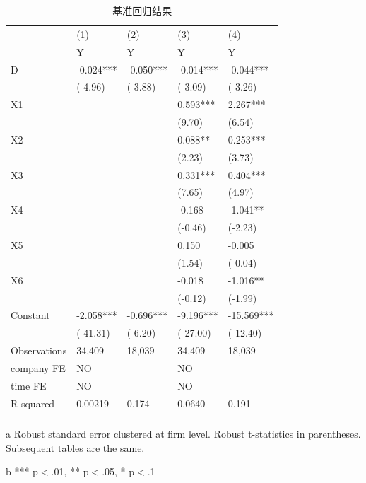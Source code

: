 \documentclass[]{WTUthesis}
\renewcommand{\toprule}{\noalign{\vskip2pt}\specialrule{1.5pt}{0pt}{0pt}\noalign{\vskip2pt}}
\renewcommand{\midrule}{\noalign{\vskip2pt}\specialrule{0.75pt}{0pt}{0pt}\noalign{\vskip2pt}}
\renewcommand{\bottomrule}{\noalign{\vskip2pt}\specialrule{1.5pt}{0pt}{0pt}\noalign{\vskip2pt}}
\begin{document}
	\begin{table}[htbp]
		\centering
		\caption{基准回归结果}
		\label{baseline}
		\begin{threeparttable}
			\begin{tabularx}{\textwidth}{l*{4}{X}}
				\toprule
				& (1) & (2) & (3) & (4) \\ 
				& Y & Y & Y & Y \\ \midrule
				D & -0.024*** & -0.050*** & -0.014*** & -0.044*** \\
				& (-4.96) & (-3.88) & (-3.09) & (-3.26) \\
				X1 &  &  & 0.593*** & 2.267*** \\
				&  &  & (9.70) & (6.54) \\
				X2 &  &  & 0.088** & 0.253*** \\
				&  &  & (2.23) & (3.73) \\
				X3 &  &  & 0.331*** & 0.404*** \\
				&  &  & (7.65) & (4.97) \\
				X4 &  &  & -0.168 & -1.041** \\
				&  &  & (-0.46) & (-2.23) \\
				X5 &  &  & 0.150 & -0.005 \\
				&  &  & (1.54) & (-0.04) \\
				X6 &  &  & -0.018 & -1.016** \\
				&  &  & (-0.12) & (-1.99) \\
				Constant & -2.058*** & -0.696*** & -9.196*** & -15.569*** \\
				& (-41.31) & (-6.20) & (-27.00) & (-12.40) \\
				Observations & 34,409 & 18,039 & 34,409 & 18,039 \\
				company   FE & NO & \checkmark & NO & \checkmark \\
				time   FE & NO & \checkmark & NO & \checkmark \\
				R-squared & 0.00219 & 0.174 & 0.0640 & 0.191 \\ \bottomrule
			\end{tabularx}
			\begin{tablenotes}
				\footnotesize
				\item[a] Robust standard error clustered at firm level. Robust t-statistics in parentheses. Subsequent tables are the same.
				\item[b] *** p$<$.01, ** p$<$.05, * p$<$.1
			\end{tablenotes}
		\end{threeparttable}
	\end{table}
\end{document}
